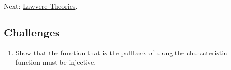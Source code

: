 Next:
\href{https://bartoszmilewski.com/2017/08/26/lawvere-theories/}{Lawvere
Theories}.

\subsection{Challenges}\label{challenges}

\begin{enumerate}
\tightlist
\item
  Show that the function  that is the pullback of
   along the characteristic function must be injective.
\end{enumerate}
